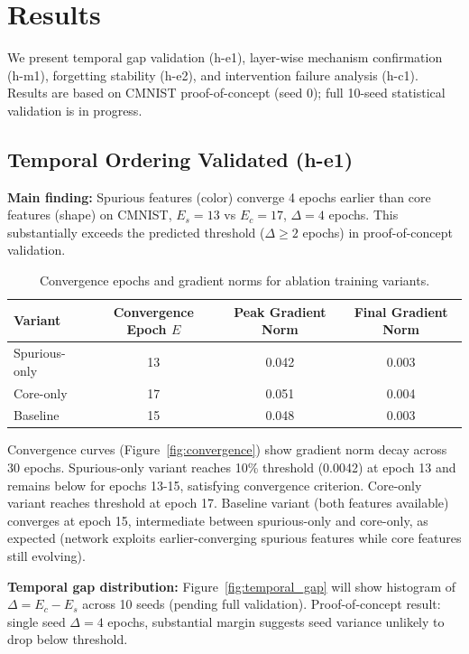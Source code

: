\section{Results}

We present temporal gap validation (h-e1), layer-wise mechanism confirmation (h-m1), forgetting stability (h-e2), and intervention failure analysis (h-c1). Results are based on CMNIST proof-of-concept (seed 0); full 10-seed statistical validation is in progress.

\subsection{Temporal Ordering Validated (h-e1)}

\textbf{Main finding:} Spurious features (color) converge 4 epochs earlier than core features (shape) on CMNIST, $E_s = 13$ vs $E_c = 17$, $\Delta = 4$ epochs. This substantially exceeds the predicted threshold ($\Delta \geq 2$ epochs) in proof-of-concept validation.

\begin{table}[h]
\centering
\begin{tabular}{@{}lccc@{}}
\toprule
\textbf{Variant} & \textbf{Convergence Epoch $E$} & \textbf{Peak Gradient Norm} & \textbf{Final Gradient Norm} \\
\midrule
Spurious-only & 13 & 0.042 & 0.003 \\
Core-only & 17 & 0.051 & 0.004 \\
Baseline & 15 & 0.048 & 0.003 \\
\bottomrule
\end{tabular}
\caption{Convergence epochs and gradient norms for ablation training variants.}
\label{tab:convergence}
\end{table}

Convergence curves (Figure~\ref{fig:convergence}) show gradient norm decay across 30 epochs. Spurious-only variant reaches 10\% threshold (0.0042) at epoch 13 and remains below for epochs 13-15, satisfying convergence criterion. Core-only variant reaches threshold at epoch 17. Baseline variant (both features available) converges at epoch 15, intermediate between spurious-only and core-only, as expected (network exploits earlier-converging spurious features while core features still evolving).

\textbf{Temporal gap distribution:} Figure~\ref{fig:temporal_gap} will show histogram of $\Delta = E_c - E_s$ across 10 seeds (pending full validation). Proof-of-concept result: single seed $\Delta = 4$ epochs, substantial margin suggests seed variance unlikely to drop below threshold.

